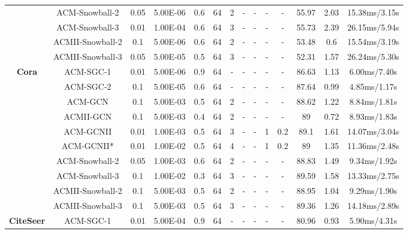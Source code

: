 \documentclass{article}
\newcommand{\0}{{\boldsymbol{0}}}
\newcommand{\6}{{\partial}}
\newcommand{\8}{{\infty}}
\newcommand{\4}{{\nabla}}
\begin{document}
\begin{table}[htbp]
{\begin{tabular}{c|c|cccccccccccc}
          & ACM-Snowball-2 & 0.05  & 5.00E-06 & 0.6   & 64    & 2     & -     & -     & -     & -     & 55.97 & 2.03  & 15.38ms/3.15s \\
          & ACM-Snowball-3 & 0.01  & 1.00E-04 & 0.6   & 64    & 3     & -     & -     & -     & -     & 55.73 & 2.39  & 26.15ms/5.94s \\
          & ACMII-Snowball-2 & 0.1   & 5.00E-06 & 0.6   & 64    & 2     & -     & -     & -     & -     & 53.48 & 0.6   & 15.54ms/3.19s \\
          & ACMII-Snowball-3 & 0.05  & 5.00E-05 & 0.5   & 64    & 3     & -     & -     & -     & -     & 52.31 & 1.57  & 26.24ms/5.30s \\
          \midrule
    \multirow{10}[0]{*}{\textbf{Cora}} & ACM-SGC-1 & 0.01  & 5.00E-06 & 0.9   & 64    & -     & -     & -     & -     & -     & 86.63 & 1.13  & 6.00ms/7.40s \\
          & ACM-SGC-2 & 0.1   & 5.00E-05 & 0.6   & 64    & -     & -     & -     & -     & -     & 87.64 & 0.99  & 4.85ms/1.17s \\
          & ACM-GCN & 0.1   & 5.00E-03 & 0.5   & 64    & 2     & -     & -     & -     & -     & 88.62 & 1.22  & 8.84ms/1.81s \\
          & ACMII-GCN & 0.1   & 5.00E-03 & 0.4   & 64    & 2     & -     & -     & -     & -     & 89    & 0.72  & 8.93ms/1.83s \\
          & ACM-GCNII & 0.01  & 1.00E-03 & 0.5   & 64    & 3     & -     & -     & 1     & 0.2   & 89.1  & 1.61  &  14.07ms/3.04s \\
          & ACM-GCNII* & 0.01  & 1.00E-02 & 0.5   & 64    & 4     & -     & -     & 1     & 0.2   & 89    & 1.35  & 11.36ms/2.48s \\
          & ACM-Snowball-2 & 0.05  & 1.00E-03 & 0.6   & 64    & 2     & -     & -     & -     & -     & 88.83 & 1.49  & 9.34ms/1.92s \\
          & ACM-Snowball-3 & 0.1   & 1.00E-02 & 0.3   & 64    & 3     & -     & -     & -     & -     & 89.59 & 1.58  & 13.33ms/2.75s \\
          & ACMII-Snowball-2 & 0.1   & 5.00E-03 & 0.5   & 64    & 2     & -     & -     & -     & -     & 88.95 & 1.04  & 9.29ms/1.90s \\
          & ACMII-Snowball-3 & 0.1   & 5.00E-03 & 0.5   & 64    & 3     & -     & -     & -     & -     & 89.36 & 1.26  & 14.18ms/2.89s \\
          \midrule
    \multirow{10}[0]{*}{\textbf{CiteSeer}} & ACM-SGC-1 & 0.01  & 5.00E-04 & 0.9   & 64    & -     & -     & -     & -     & -     & {80.96} & 0.93  & 5.90ms/4.31s \\

\end{tabular}}
\end{table}
\end{document}
